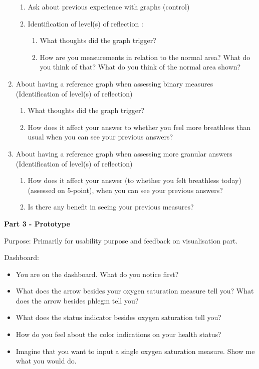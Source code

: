\begin{enumerate}
\begin{enumerate}
	\item Ask about previous experience with graphs (control)
	\item Identification of level(s) of reflection :
	\begin{enumerate}
		\item What thoughts did the graph trigger?
		\item How are you measurements in relation to the normal area? What do you think of that? What do you think of the normal area shown?
	\end{enumerate}
\end{enumerate}
\item About having a reference graph when assessing binary measures (Identification of level(s) of reflection)
\begin{enumerate}
	\item What thoughts did the graph trigger?
	\item How does it affect your answer to whether you feel more breathless than usual when you can see your previous answers?
\end{enumerate}
\item About having a reference graph when assessing more granular answers (Identification of level(s) of reflection)
\begin{enumerate}
	\item How does it affect your answer (to whether you felt breathless today) (assessed on 5-point), when you can see your previous answers?
	\item Is there any benefit in seeing your previous measures?
\end{enumerate}
\end{enumerate}


\textbf{Part 3 - Prototype}

Purpose: Primarily for usability purpose and feedback on visualisation part.

Dashboard:
\begin{itemize}
\item You are on the dashboard. What do you notice first?
\item What does the arrow besides your oxygen saturation measure tell you? What does the arrow besides phlegm tell you?
\item What does the status indicator besides oxygen saturation tell you?
\item How do you feel about the color indications on your health status?
\item Imagine that you want to input a single oxygen saturation measure. Show me what you would do. 
\end{itemize}

